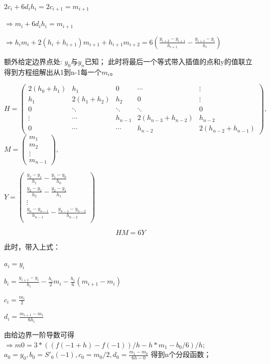 \documentclass[12pt,a4paper,UTF8]{ctexart}
\begin{document}
\begin{enumerate}
\qquad $2c_i + 6d_ih_i = 2c_{i+1} = m_{i+1}$

\quad $\Rightarrow m_i + 6d_ih_i = m_{i+1}$

\quad $\Rightarrow h_{i}m_i + 2(h_i + h_{i+1})m_{i+1} + h_{i+1}m_{i+2} = 6(\frac{y_{i+2}-y_{i+1}}{h_{i+1}} - \frac{y_{i+1}-y_i}{h_i})$

\quad 额外给定边界点处: $y_0$与$y_n$已知；
此时将最后一个等式带入插值的点和y的值联立得到方程组解出从1到n-1每一个$m_i$。

$H = 
\begin{pmatrix}
    2(h_0+h_1) & h_1 & 0 & \cdots & \vdots\\
    h_1 & 2(h_1+h_2) & h_2 & 0 & \vdots\\
    0 & \ddots & \ddots & \ddots & 0\\
    \vdots & \cdots & h_{n-1} & 2(h_{n-3}+h_{n-2}) & h_{n-2}\\
    0  & \cdots & \cdots & h_{n-2} & 2(h_{n-2}+h_{n-1}) 
\end{pmatrix},$
$M = 
\begin{pmatrix}
m_1\\
m_2\\
\vdots\\
m_{n-1}
\end{pmatrix},$

$Y = 
\begin{pmatrix}
\frac{y_2-y_1}{h_1}-\frac{y_1-y_0}{h_0}\\
\frac{y_3-y_2}{h_2}-\frac{y_2-y_1}{h_1}\\
\vdots\\
\frac{y_{n}-y_{n-1}}{h_{n-1}}-\frac{y_{n-1}-y_{n-2}}{h_{n-2}}\\
\end{pmatrix}$

\begin{equation}
    HM = 6Y
\end{equation}

此时，带入上式：

\qquad $a_i = y_i$

\qquad $b_i = \frac{y_{i+1} - y_i}{h_i} - \frac{h_i}{2} m_i - \frac{h_i}{6}(m_{i+1}-m_i)$

\qquad $c_i = \frac{m_i}{2}$

\qquad $ d_i = \frac{m_{i+1} - m_i}{6h_i}$

由给边界一阶导数可得
$\Rightarrow m0 = 3*((f(-1+h)-f(-1))/h - h*m_1 - b_0/6)/h;$\\
$a_0 = y_0,b_0 = S'_0(-1),c_0 = m_0/2,d_0 = \frac{m_1-m_0}{6h-0}$
得到n个分段函数；


\end{enumerate}
\end{document}
